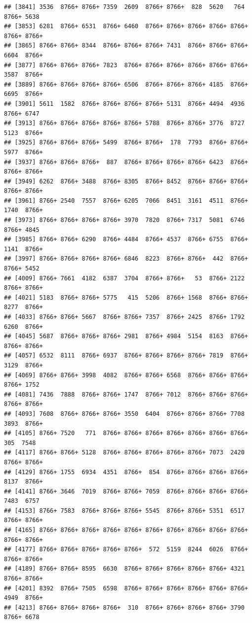 \documentclass[
]{book}
\begin{document}
\begin{verbatim}
## [3841] 3536  8766+ 8766+ 7359  2609  8766+ 8766+  828  5620   764  8766+ 5638 
## [3853] 6281  8766+ 6531  8766+ 6460  8766+ 8766+ 8766+ 8766+ 8766+ 8766+ 8766+
## [3865] 8766+ 8766+ 8344  8766+ 8766+ 8766+ 7431  8766+ 8766+ 8766+ 6604  8766+
## [3877] 8766+ 8766+ 8766+ 7823  8766+ 8766+ 8766+ 8766+ 8766+ 8766+ 3587  8766+
## [3889] 8766+ 8766+ 8766+ 8766+ 6506  8766+ 8766+ 8766+ 4185  8766+ 6695  8766+
## [3901] 5611  1582  8766+ 8766+ 8766+ 8766+ 5131  8766+ 4494  4936  8766+ 6747 
## [3913] 8766+ 8766+ 8766+ 8766+ 8766+ 5788  8766+ 8766+ 3776  8727  5123  8766+
## [3925] 8766+ 8766+ 8766+ 5499  8766+ 8766+  178  7793  8766+ 8766+ 5977  8766+
## [3937] 8766+ 8766+ 8766+  887  8766+ 8766+ 8766+ 8766+ 6423  8766+ 8766+ 8766+
## [3949] 6262  8766+ 3488  8766+ 8305  8766+ 8452  8766+ 8766+ 8766+ 8766+ 8766+
## [3961] 8766+ 2540  7557  8766+ 6205  7066  8451  3161  4511  8766+ 1740  8766+
## [3973] 8766+ 8766+ 8766+ 8766+ 3970  7820  8766+ 7317  5081  6746  8766+ 4845 
## [3985] 8766+ 8766+ 6290  8766+ 4484  8766+ 4537  8766+ 6755  8766+ 1141  8766+
## [3997] 8766+ 8766+ 8766+ 8766+ 6846  8223  8766+ 8766+  442  8766+ 8766+ 5452 
## [4009] 8766+ 7661  4182  6387  3704  8766+ 8766+   53  8766+ 2122  8766+ 8766+
## [4021] 5183  8766+ 8766+ 5775   415  5206  8766+ 1568  8766+ 8766+ 8277  8766+
## [4033] 8766+ 8766+ 5667  8766+ 8766+ 7357  8766+ 2425  8766+ 1792  6260  8766+
## [4045] 5687  8766+ 8766+ 8766+ 2981  8766+ 4984  5154  8163  8766+ 8766+ 8766+
## [4057] 6532  8111  8766+ 6937  8766+ 8766+ 8766+ 8766+ 7819  8766+ 3129  8766+
## [4069] 8766+ 8766+ 3998  4082  8766+ 8766+ 6568  8766+ 8766+ 8766+ 8766+ 1752 
## [4081] 7436  7888  8766+ 8766+ 1747  8766+ 7012  8766+ 8766+ 8766+ 8766+ 8766+
## [4093] 7608  8766+ 8766+ 8766+ 3550  6404  8766+ 8766+ 8766+ 7708  3893  8766+
## [4105] 8766+ 7520   771  8766+ 8766+ 8766+ 8766+ 8766+ 8766+ 8766+  305  7548 
## [4117] 8766+ 8766+ 5128  8766+ 8766+ 8766+ 8766+ 8766+ 7073  2420  8766+ 8766+
## [4129] 8766+ 1755  6934  4351  8766+  854  8766+ 8766+ 8766+ 8766+ 8137  8766+
## [4141] 8766+ 3646  7019  8766+ 8766+ 7059  8766+ 8766+ 8766+ 8766+ 7483  6757 
## [4153] 8766+ 7583  8766+ 8766+ 8766+ 5545  8766+ 8766+ 5351  6517  8766+ 8766+
## [4165] 8766+ 8766+ 8766+ 8766+ 8766+ 8766+ 8766+ 8766+ 8766+ 8766+ 8766+ 8766+
## [4177] 8766+ 8766+ 8766+ 8766+ 8766+  572  5159  8244  6026  8766+ 8766+ 8766+
## [4189] 8766+ 8766+ 8595  6630  8766+ 8766+ 8766+ 8766+ 8766+ 4321  8766+ 8766+
## [4201] 8392  8766+ 7505  6598  8766+ 8766+ 8766+ 8766+ 8766+ 8766+ 4949  8766+
## [4213] 8766+ 8766+ 8766+ 8766+  310  8766+ 8766+ 8766+ 8766+ 3790  8766+ 6678 

\end{verbatim}
\end{document}
